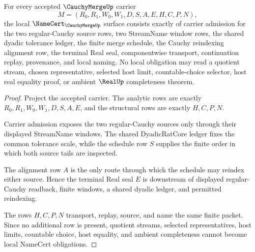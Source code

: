 \begin{theorem}
\label{thm:cauchy-merge-namecert-obligations}
For every accepted $\CauchyMergeUp$ carrier
$$
M=(R_0,R_1,W_0,W_1,D,S,A,E,H,C,P,N),
$$
the local $\NameCert_{\CauchyMergeUp}$ surface consists exactly of carrier admission for the two regular-Cauchy source rows, two StreamName window rows, the shared dyadic tolerance ledger, the finite merge schedule, the Cauchy reindexing alignment row, the terminal Real seal, componentwise transport, continuation replay, provenance, and local naming. No local obligation may read a quotient stream, chosen representative, selected host limit, countable-choice selector, host real equality proof, or ambient $\RealUp$ completeness theorem.
\end{theorem}
\begin{proof}
Project the accepted carrier. The analytic rows are exactly $R_0,R_1,W_0,W_1,D,S,A,E$, and the structural rows are exactly $H,C,P,N$.

Carrier admission exposes the two regular-Cauchy sources only through their displayed StreamName windows. The shared DyadicRatCore ledger fixes the common tolerance scale, while the schedule row $S$ supplies the finite order in which both source tails are inspected.

The alignment row $A$ is the only route through which the schedule may reindex either source. Hence the terminal Real seal $E$ is downstream of displayed regular-Cauchy readback, finite windows, a shared dyadic ledger, and permitted reindexing.

The rows $H,C,P,N$ transport, replay, source, and name the same finite packet. Since no additional row is present, quotient streams, selected representatives, host limits, countable choice, host equality, and ambient completeness cannot become local NameCert obligations.
\end{proof}

